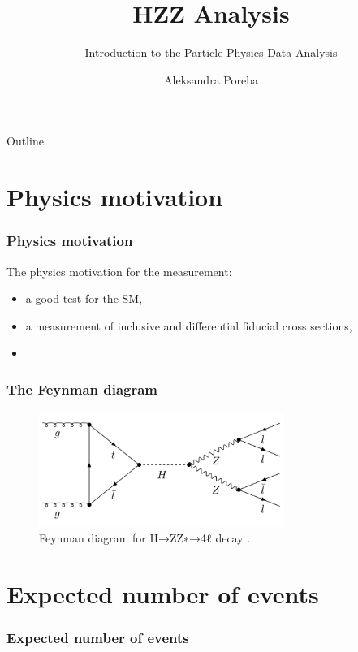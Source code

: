 \documentclass[aspectratio=1610, english]{beamer}
\author[Aleksandra Poreba]{Aleksandra Poreba}
\date{}
\title{HZZ Analysis}
\subtitle{Introduction to the Particle Physics Data Analysis}
\begin{document}
\maketitle

\begin{frame}{Outline}
	\tableofcontents
\end{frame}

\section{Physics motivation}

\begin{frame}
\frametitle{Physics motivation}
The physics motivation for the measurement:
\begin{itemize}
\item a good test for the SM,
\item a measurement of inclusive and differential fiducial cross sections,
\item
\end{itemize}

\end{frame}

\begin{frame}
\frametitle{The Feynman diagram}

\begin{figure} [H]
\centering
\includegraphics[width=8cm]{feynman_diagram.png}
\caption{Feynman diagram for H→ZZ∗→4ℓ decay \cite{diagram}. }
\end{figure}

\end{frame}

\section{Expected number of events}

\begin{frame}
\frametitle{Expected number of events}


\end{frame}
\end{document}
